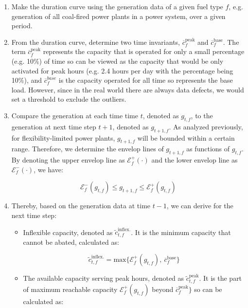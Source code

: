 \begin{enumerate}
	\item Make the duration curve using the generation data of a given fuel type $f$, e.g. generation of all coal-fired power plants in a power system, over a given period.
	
	\item From the duration curve, determine two time invariants, $\overline{c}_f^{\text{peak}}$ and $\overline{c}_f^{\text{base}}$. The term $\overline{c}_f^{\text{peak}}$ represents the capacity that is operated for only a small percentage (e.g. 10\%) of time so can be viewed as the capacity that would be only activated for peak hours (e.g. 2.4 hours per day with the percentage being 10\%), and $\overline{c}_f^{base}$ is the capacity operated for all time so represents the base load. However, since in the real world there are always data defects, we would set a threshold to exclude the outliers. 
	
	\item Compare the generation at each time time $t$, denoted as $g_{t,f}$, to the generation at next time step $t+1$, denoted as $g_{t+1,f}$. As analyzed previously, for flexibility-limited power plants, $g_{t+1,f}$ will be bounded within a certain range. Therefore, we determine the envelop lines of $g_{t+1,f}$ as functions of $g_{t,f}$. By denoting the upper envelop line as $\mathcal{E}_f^+(\cdot)$ and the lower envelop line as $\mathcal{E}_f^-(\cdot)$, we have:
	
	\begin{equation*}
		\mathcal{E}_f^-(g_{t,f}) \leq g_{t+1,f} \leq \mathcal{E}_f^+(g_{t,f}) 
	\end{equation*}
	
	\item Thereby, based on the generation data at time $t-1$, we can derive for the next time step:
	
	\begin{itemize}
		\item Inflexible capacity, denoted as $\tilde{c}_{t,f}^{\text{inflex.}}$. It is the minimum capacity that cannot be abated, calculated as:
		
		\begin{equation*}
		\tilde{c}_{t,f}^{\text{inflex.}} = \text{max}\{\mathcal{E}_f^+(g_{t,f}),~\overline{c}_f^{\text{base}}\}
		\end{equation*}
		
		\item The available capacity serving peak hours, denoted as $\tilde{c}_{t,f}^{\text{peak}}$. It is the part of maximum reachable capacity $\mathcal{E}_f^+(g_{t,f})$ beyond $\overline{c}_f^{\text{peak}}\}$ so can be calculated as:
		

\end{itemize}
\end{enumerate}
